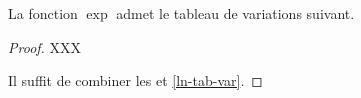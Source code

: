 \begin{fact} \label{ln-tab-var}
	La fonction $\exp$ admet le tableau de variations suivant.
	\begin{center}
	\end{center}
\end{fact}


\begin{proof}
	XXX
	
	Il suffit de combiner les  et \ref{ln-tab-var}.
\end{proof}
